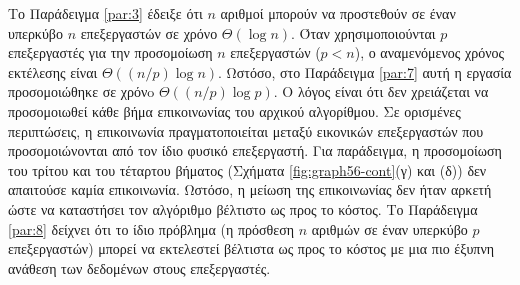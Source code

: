 \documentclass[12pt,a4paper]{article} %
\begin{document}
\begin{sloppypar}
Το Παράδειγμα \ref{par:3} έδειξε ότι $n$ αριθμοί μπορούν να προστεθούν σε 
έναν υπερκύβο $n$ επεξεργαστών σε χρόνο $\Theta(\log n)$. Όταν χρησιμοποιούνται 
$p$ επεξεργαστές για την προσομοίωση $n$ επεξεργαστών ($p<n$), ο αναμενόμενος 
χρόνος εκτέλεσης είναι $\Theta((n/p)\log n)$. Ωστόσο, στο Παράδειγμα \ref{par:7} 
αυτή η εργασία προσομοιώθηκε σε χρόνo $\Theta((n/p)\log p)$. Ο λόγος είναι 
ότι δεν χρειάζεται να προσομοιωθεί κάθε βήμα επικοινωνίας του αρχικού 
αλγορίθμου. Σε ορισμένες περιπτώσεις, η επικοινωνία πραγματοποιείται μεταξύ 
εικονικών επεξεργαστών που προσομοιώνονται από τον ίδιο φυσικό επεξεργαστή. 
Για παράδειγμα, η προσομοίωση του τρίτου και του τέταρτου βήματος {(}Σχήματα 
\ref{fig:graph56-cont}(γ) και (δ){)} δεν απαιτούσε καμία επικοινωνία.
Ωστόσο, η μείωση της επικοινωνίας δεν ήταν αρκετή ώστε να καταστήσει τον 
αλγόριθμο βέλτιστο ως προς το κόστος. Το Παράδειγμα \ref{par:8} δείχνει 
ότι το ίδιο πρόβλημα (η πρόσθεση $n$ αριθμών σε έναν υπερκύβο $p$ επεξεργαστών) 
μπορεί να εκτελεστεί βέλτιστα ως προς το κόστος με μια πιο έξυπνη ανάθεση 
των δεδομένων στους επεξεργαστές.
\end{sloppypar}
\end{document}
